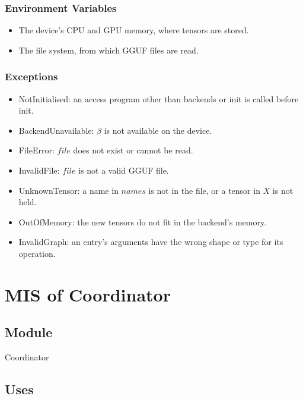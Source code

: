 \documentclass[12pt, titlepage]{article}
\begin{document}
\subsubsection{Environment Variables}

\begin{itemize}
  \item The device's CPU and GPU memory, where tensors are stored.
  \item The file system, from which GGUF files are read.
\end{itemize}

\subsubsection{Exceptions}

\begin{itemize}
  \item NotInitialised: an access program other than backends or init is
    called before init.
  \item BackendUnavailable: $\beta$ is not available on the device.
  \item FileError: $\mathit{file}$ does not exist or cannot be read.
  \item InvalidFile: $\mathit{file}$ is not a valid GGUF file.
  \item UnknownTensor: a name in $\mathit{names}$ is not in the file, or a
    tensor in $X$ is not held.
  \item OutOfMemory: the new tensors do not fit in the backend's memory.
  \item InvalidGraph: an entry's arguments have the wrong shape or type for
    its operation.
\end{itemize}

\newpage

\section{MIS of Coordinator} \label{mis:coordinator}

\subsection{Module}

Coordinator

\subsection{Uses}
\end{document}
